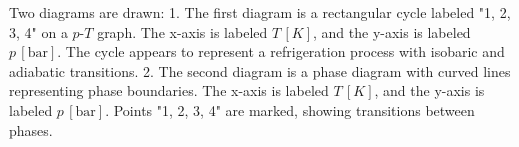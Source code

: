 Two diagrams are drawn:  
1. The first diagram is a rectangular cycle labeled "1, 2, 3, 4" on a \( p \)-\( T \) graph. The x-axis is labeled \( T \, [K] \), and the y-axis is labeled \( p \, [\text{bar}] \). The cycle appears to represent a refrigeration process with isobaric and adiabatic transitions.  
2. The second diagram is a phase diagram with curved lines representing phase boundaries. The x-axis is labeled \( T \, [K] \), and the y-axis is labeled \( p \, [\text{bar}] \). Points "1, 2, 3, 4" are marked, showing transitions between phases.